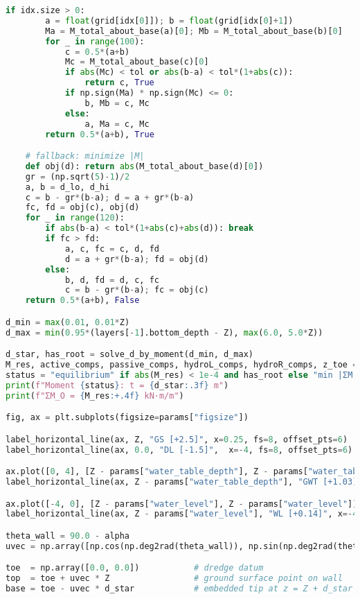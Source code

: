 \begin{lstlisting}[language=Python]
    if idx.size > 0:
        a = float(grid[idx[0]]); b = float(grid[idx[0]+1])
        Ma = M_total_about_base(a)[0]; Mb = M_total_about_base(b)[0]
        for _ in range(100):
            c = 0.5*(a+b)
            Mc = M_total_about_base(c)[0]
            if abs(Mc) < tol or abs(b-a) < tol*(1+abs(c)):
                return c, True
            if np.sign(Ma) * np.sign(Mc) <= 0:
                b, Mb = c, Mc
            else:
                a, Ma = c, Mc
        return 0.5*(a+b), True

    # fallback: minimize |M|
    def obj(d): return abs(M_total_about_base(d)[0])
    gr = (np.sqrt(5)-1)/2
    a, b = d_lo, d_hi
    c = b - gr*(b-a); d = a + gr*(b-a)
    fc, fd = obj(c), obj(d)
    for _ in range(120):
        if abs(b-a) < tol*(1+abs(c)+abs(d)): break
        if fc > fd:
            a, c, fc = c, d, fd
            d = a + gr*(b-a); fd = obj(d)
        else:
            b, d, fd = d, c, fc
            c = b - gr*(b-a); fc = obj(c)
    return 0.5*(a+b), False

d_min = max(0.01, 0.01*Z)
d_max = min(0.95*(layers[-1].bottom_depth - Z), max(6.0, 5.0*Z))

d_star, has_root = solve_d_by_moment(d_min, d_max)
M_res, active_comps, passive_comps, hydroL_comps, hydroR_comps, z_toe = M_total_about_base(d_star)
status = "equilibrium" if abs(M_res) < 1e-4 and has_root else "min |ΣM|"
print(f"Moment {status}: t = {d_star:.3f} m")
print(f"ΣM_O = {M_res:+.4f} kN·m/m")

fig, ax = plt.subplots(figsize=params["figsize"])

label_horizontal_line(ax, Z, "GS [+2.5]", x=0.25, fs=8, offset_pts=6)
label_horizontal_line(ax, 0.0, "DL [-1.5]",  x=-4, fs=8, offset_pts=6)

ax.plot([0, 4], [Z - params["water_table_depth"], Z - params["water_table_depth"]], linestyle="--", linewidth=1.5, color="black")
label_horizontal_line(ax, Z - params["water_table_depth"], "GWT [+1.03]", x=0.25, fs=8, offset_pts=6)

ax.plot([-4, 0], [Z - params["water_level"], Z - params["water_level"]], linestyle="--", linewidth=1.5, color="black")
label_horizontal_line(ax, Z - params["water_level"], "WL [+0.14]", x=-4, fs=8, offset_pts=6)

theta_wall = 90.0 - alpha
uvec = np.array([np.cos(np.deg2rad(theta_wall)), np.sin(np.deg2rad(theta_wall))])

toe  = np.array([0.0, 0.0])           # dredge datum
top  = toe + uvec * Z                 # ground surface point on wall
base = toe - uvec * d_star            # embedded tip at z = Z + d_star


\end{lstlisting}
